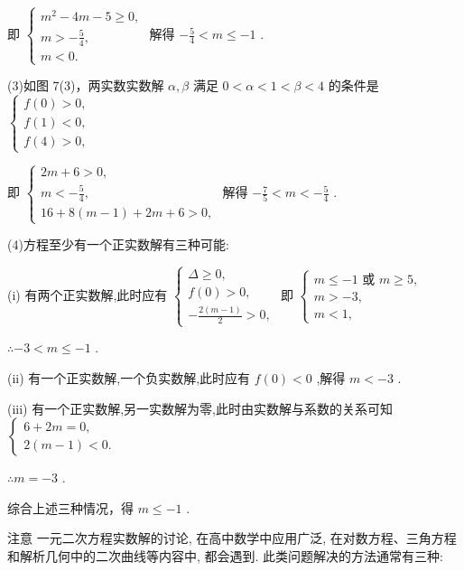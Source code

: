 \documentclass[10pt]{article}
\begin{document}
即 \(\left\{  \begin{array}{l} {m}^{2} - {4m} - 5 \geq  0, \\  m >  - \frac{5}{4}, \\  m < 0. \end{array}\right.\) 解得 \(- \frac{5}{4} < m \leq   - 1\) .

(3)如图 7(3)，两实数实数解 \(\alpha ,\beta\) 满足 \(0 < \alpha  < 1 < \beta  < 4\) 的条件是 \(\left\{  \begin{array}{l} f\left( 0\right)  > 0, \\  f\left( 1\right)  < 0, \\  f\left( 4\right)  > 0, \end{array}\right.\)

即 \(\left\{  \begin{array}{l} {2m} + 6 > 0, \\  m <  - \frac{5}{4}, \\  {16} + 8\left( {m - 1}\right)  + {2m} + 6 > 0, \end{array}\right.\) 解得 \(- \frac{7}{5} < m <  - \frac{5}{4}\) .

(4)方程至少有一个正实数解有三种可能:

(i) 有两个正实数解,此时应有 \(\left\{  \begin{array}{l} \Delta  \geq  0, \\  f\left( 0\right)  > 0, \\   - \frac{2\left( {m - 1}\right) }{2} > 0, \end{array}\right.\) 即 \(\left\{  \begin{array}{l} m \leq   - 1\text{ 或 }m \geq  5, \\  m >  - 3, \\  m < 1, \end{array}\right.\)

\(\therefore  - 3 < m \leq   - 1\) .

(ii) 有一个正实数解,一个负实数解,此时应有 \(f\left( 0\right)  < 0\) ,解得 \(m <  - 3\) .

(iii) 有一个正实数解,另一实数解为零,此时由实数解与系数的关系可知 \(\left\{  \begin{array}{l} 6 + {2m} = 0, \\  2\left( {m - 1}\right)  < 0. \end{array}\right.\)

\(\therefore m =  - 3\) .

综合上述三种情况，得 \(m \leq   - 1\) .

注意 一元二次方程实数解的讨论, 在高中数学中应用广泛, 在对数方程、三角方程和解析几何中的二次曲线等内容中, 都会遇到. 此类问题解决的方法通常有三种:
\end{document}
